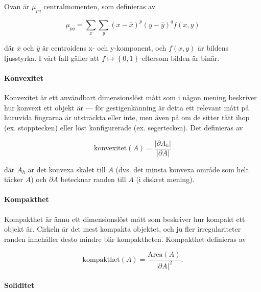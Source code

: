 \documentclass[../rapport_MVEX01-11-05]{subfiles}
\begin{document}
Ovan är $\mu_{pq}$ centralmomenten, som definieras av

\begin{equation*}
	\mu_{pq} = \sum\limits_x\sum\limits_y
	           \left(x-\bar{x}\right)^p
	           \left(y-\bar{y}\right)^q
	           f(x,y)
\end{equation*}

där $\bar{x}$ och $\bar{y}$ är centroidens x- och y-komponent, och $f(x,y)$ är
bildens ljusstyrka. I vårt fall gäller att $f\mapsto\left\{0,1\right\}$
eftersom bilden är binär.

\paragraph{Konvexitet}

Konvexitet \cite[s.~26]{Rudemo09} är ett användbart dimensionslöst
mått som i någon mening beskriver hur konvext ett objekt är --- för
gestigenkänning är detta ett relevant mått på huruvida fingrarna är
utsträckta eller inte, men även på om de sitter tätt ihop (ex.
stopptecken) eller löst konfigurerade (ex. segertecken). Det
definieras av

\begin{equation*}
  \textrm{konvexitet}(A) = \frac{\left|\partial A_h\right|}{\left|\partial A\right|}
\end{equation*}

där $A_h$ är det konvexa skalet till $A$ (dvs. det minsta konvexa område som
helt täcker $A$) och $\partial A$ betecknar randen till $A$ (i diskret
mening).

\paragraph{Kompakthet}

Kompakthet \cite[s.~26]{Rudemo09} är ännu ett dimensionslöst mått som
beskriver hur kompakt ett objekt är.
Cirkeln är det mest kompakta objektet, och ju fler irregulariteter
randen innehåller desto mindre blir kompaktheten. Kompakthet
definieras av

\begin{equation*}
  \textrm{kompakthet}(A) = \frac{\textrm{Area}(A)}{\left|\partial
  A\right|^2}.
\end{equation*}

\paragraph{Soliditet}
\label{feat:soliditet}
\end{document}
